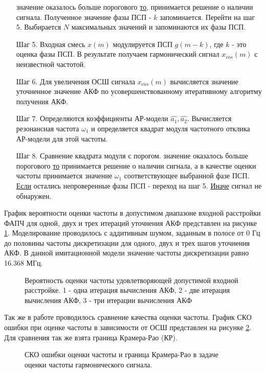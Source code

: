 \begin{itemize}
	  значение оказалось больше порогового {\underline{то}},
		принимается решение о наличии сигнала. Полученное значение фазы ПСП  - ${k}$ запоминается.
		Перейти на шаг 5.
		Выбирается ${N}$ максимальных значений и запоминаются их фазы ПСП.
\item[Шаг 5.] Входная смесь ${x(m)}$ модулируется ПСП ${g(m-k)}$, где ${k}$ - это оценка фазы ПСП. В результате получаем гармонический
	сигнал ${x_{cos}(m)}$ с неизвестной частотой.
\item[Шаг 6.] Для увеличения ОСШ сигнала ${x_{cos}(m)}$ вычисляется значение уточненное значение АКФ
	по усовершенствованному итеративному алгоритму получения АКФ.
\item[Шаг 7.] Определяются коэффициенты АР-модели ${\hat{a_1}, \hat{a_2}}$.
	Вычисляется резонансная частота ${\omega_1}$ и определяется квадрат модуля частотного отклика АР-модели для этой частоты. 
\item[Шаг 8.]
	Сравнение квадрата модуля с порогом.
          значение оказалось больше порогового {\underline{то}} 
                принимается решение о наличии сигнала, а в качестве оценки
                частоты принимается значение ${\omega_1}$ соответствующее выбранной фазе ПСП. 
		\subsubitem\underline{Если} остались непроверенные фазы ПСП - переход на шаг 5.
		\subsubitem\underline{Иначе} сигнал не обнаружен.
\end{itemize}

График вероятности оценки частоты в допустимом диапазоне входной расстройки ФАПЧ для одной, двух и трех итераций уточнения АКФ представлен на рисунке
\ref{pic:ar_dma_probability}. Моделирование проводилось с аддитивным шумом, заданным в полосе от 0 Гц до
половины частоты дискретизации для одного, двух и трех шагов уточнения АКФ. В данной имитационной модели значение частоты дискретизации равно 16.368 МГц.
\begin{figure}[h]
\center{}
	\caption{Вероятность оценки частоты удовлетворяющей допустимой входной расстройке. 1 - одна итерация вычисления АКФ, 2 - две итерация вычисления АКФ, 3 - три итерации вычисления АКФ}
	\label{pic:ar_dma_probability}
\end{figure}

Так же в работе проводилось сравнение качества оценки частоты. График СКО ошибки при оценке частоты в зависимости
от ОСШ представлен на рисунке \ref{pic:crlb_vs_snr}. Для сравнения так же взята граница Крамера-Рао (КР).
\begin{figure}[h]
\center{}
	\caption{СКО ошибки оценки частоты и граница Крамера-Рао в задаче оценки частоты гармонического сигнала.}
	\label{pic:crlb_vs_snr}
\end{figure}

